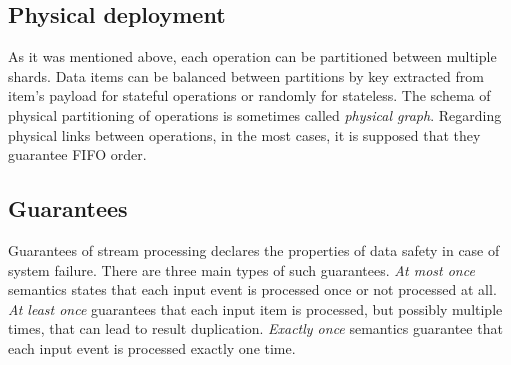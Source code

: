 \subsection{Physical deployment}
As it was mentioned above, each operation can be partitioned between multiple shards. Data items can be balanced between partitions by key extracted from item's payload for stateful operations or randomly for stateless. The schema of physical partitioning of operations is sometimes called {\it physical graph}. Regarding physical links between operations, in the most cases, it is supposed that they guarantee FIFO order.

\subsection{Guarantees}
Guarantees of stream processing declares the properties of data safety in case of system failure. There are three main types of such guarantees. {\it At most once} semantics states that each input event is processed once or not processed at all. {\it At least once} guarantees that each input item is processed, but possibly multiple times, that can lead to result duplication. {\it Exactly once} semantics guarantee that each input event is processed exactly one time.  
